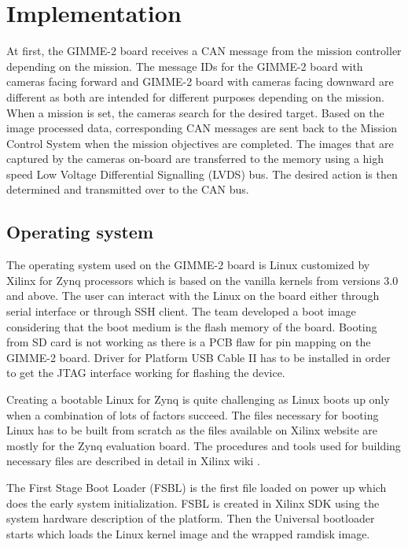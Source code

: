 \section{Implementation}\label{sec:implementation}
At first, the GIMME-2 board receives a CAN message from the mission controller depending on the mission. The message IDs for the GIMME-2 board with cameras facing forward and GIMME-2 board with cameras facing downward are different as both are intended for different purposes depending on the mission. When a mission is set, the cameras search for the desired target. Based on the image processed data, corresponding CAN messages are sent back to the Mission Control System when the mission objectives are completed. The images that are captured by the cameras on-board are transferred to the memory using a high speed Low Voltage Differential Signalling (LVDS) bus. The desired action is then determined and transmitted over to the CAN bus.

\subsection{Operating system}
The operating system used on the GIMME-2 board is Linux customized by Xilinx for Zynq processors which is based on the vanilla kernels from versions 3.0 and above. The user can interact with the Linux on the board either through serial interface or through SSH client. The team developed a boot image considering that the boot medium is the flash memory of the board. Booting from SD card is not working as there is a PCB flaw for pin mapping on the GIMME-2 board. Driver for Platform USB Cable II has to be installed in order to get the JTAG interface working for flashing the device.

Creating a bootable Linux for Zynq is quite challenging as Linux boots up only when a combination of lots of factors succeed. The files necessary for booting Linux has to be built from scratch as the files available on Xilinx website are mostly for the Zynq evaluation board. The procedures and tools used for building necessary files are described in detail in Xilinx wiki \cite{XilinxWiki}. 

The First Stage Boot Loader (FSBL) is the first file loaded on power up which does the early system initialization. FSBL is created in Xilinx SDK using the system hardware description of the platform. Then the Universal bootloader starts which loads the Linux kernel image and the wrapped ramdisk image.

